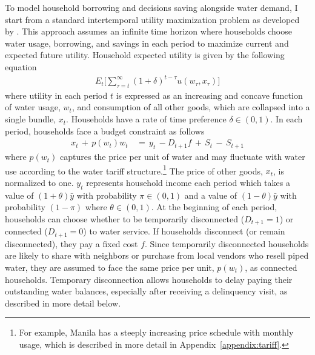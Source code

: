 \documentclass[12pt]{article}
\begin{document}
To model household borrowing and decisions saving alongside water demand, I start from a standard intertemporal utility maximization problem as developed by \cite{deaton1991saving}.  This approach assumes an infinite time horizon where households choose water usage, borrowing, and savings in each period to maximize current and expected future utility.  Household expected utility is given by the following equation
\begin{align}\label{eq:u}
E_t \Big[ \sum_{\tau = t}^{\infty} (1+\delta)^{t-\tau} u(w_{\tau},x_{\tau})   \Big]
\end{align}
where utility in each period $t$ is expressed as an increasing and concave function of water usage, $w_{t}$, and consumption of all other goods, which are collapsed into a single bundle, $x_{t}$.  Households have a rate of time preference $\delta \in (0,1)$.  In each period, households face a budget constraint as follows
\begin{align}\label{eq:bc}
x_t \, + \, p(w_t) w_t \, &= \, y_t \, - D_{t+1} f  \, + \, S_t \, - \, S_{t+1}
\end{align}
where $p(w_t)$ captures the price per unit of water and may fluctuate with water use according to the water tariff structure.\footnote{For example, Manila has a steeply increasing price schedule with monthly usage, which is described in more detail in Appendix~\ref{appendix:tariff}.}  The price of other goods, $x_t$, is normalized to one.  $y_t$ represents household income each period which takes a value of $(1+\theta)\bar{y}$ with probability $\pi \in (0,1)$ and a value of $(1-\theta)\bar{y}$ with probability $(1-\pi)$ where $\theta  \in (0,1)$.  At the beginning of each period, households can choose whether to be temporarily disconnected ($D_{t+1}=1$) or connected ($D_{t+1}=0$) to water service.  If households disconnect (or remain disconnected), they pay a fixed cost $f$.  Since temporarily disconnected households are likely to share with neighbors or purchase from local vendors who resell piped water, they are assumed to face the same price per unit, $p(w_t)$, as connected households.  Temporary disconnection allows households to delay paying their outstanding water balances, especially after receiving a delinquency visit, as described in more detail below.  
\end{document}
